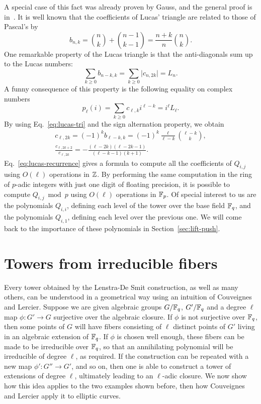 \documentclass{sig-alternate}
\begin{document}
A special case of this fact was already proven by Gauss, and the
general proof is in~\cite[Proposition~1]{gurak06}.  It is well known
that the coefficients of Lucas' triangle are related to those of
Pascal's by
\begin{equation}
  \label{eq:lucas-tri}
  b_{n,k} = \binom{n}{k} + \binom{n-1}{k-1} = \frac{n+k}{n}\binom{n}{k}.
\end{equation}
One remarkable property of the Lucas triangle is that the
anti-diagonals sum up to the Lucas numbers:
\begin{equation}
  \sum_{k\ge0} b_{n-k,k} = \sum_{k\ge0} \lvert c_{n,2k}\rvert = L_n.
\end{equation}
A funny consequence of this property is the following equality on
complex numbers
\begin{equation}
  \label{eq:lucas-fun}
  p_\ell(i) = \sum_{k\ge0} c_{\ell,k}i^{\ell-k} = i^\ell L_\ell.
\end{equation}
By using Eq.~\eqref{eq:lucas-tri} and the sign alternation property,
we obtain 
\begin{gather}
  c_{\ell,2k} = (-1)^kb_{\ell-k,k} = (-1)^k\frac{\ell}{\ell-k}\binom{\ell-k}{k},\\
  \label{eq:lucas-recurrence}
  \frac{c_{\ell,2k+2}}{c_{\ell,2k}} = 
  -\frac{(\ell-2k)(\ell-2k-1)}{(\ell-k-1)(k+1)}.
\end{gather}
Eq.~\eqref{eq:lucas-recurrence} gives a formula to compute all the
coefficients of $Q_{i,j}$ using $O(\ell)$ operations in $\mathbb{Z}$. By
performing the same computation in the ring of $p$-adic integers with
just one digit of floating precision, it is possible to compute
$Q_{i,j}\bmod p$ using $O(\ell)$ operations in $\mathbb{F}_p$. Of special
interest to us are the polynomials $Q_{i,i}$, defining each level of
the tower over the base field $\mathbb{F}_q$, and the polynomials $Q_{i,1}$,
defining each level over the previous one. We will come back to the
importance of these polynomials in Section~\ref{sec:lift-push}.



\section{Towers from irreducible fibers}
\label{sec:fibers}
Every tower obtained by the Lenstra-De Smit construction, as well as
many others, can be understood in a geometrical way using an intuition
of Couveignes and Lercier\cite{couveignes+lercier11}. Suppose we are
given algebraic groups $G/\mathbb{F}_q$, $G'/\mathbb{F}_q$ and a degree $\ell$ map
$\phi:G'\to G$ surjective over the algebraic closure. If $\phi$ is not
surjective over $\mathbb{F}_q$, then some points of $G$ will have fibers
consisting of $\ell$ distinct points of $G'$ living in an algebraic
extension of $\mathbb{F}_q$. If $\phi$ is chosen well enough, these fibers can
be made to be irreducible over $\mathbb{F}_q$, so that an annihilating
polynomial will be irreducible of degree $\ell$, as required. If the
construction can be repeated with a new map $\phi':G''\to G'$, and so
on, then one is able to construct a tower of extensions of degree
$\ell$, ultimately leading to an $\ell$-adic closure. We now show how
this idea applies to the two examples shown before, then how
Couveignes and Lercier apply it to elliptic curves.
\end{document}
